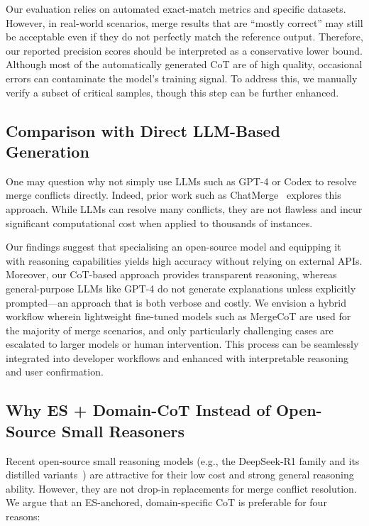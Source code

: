 \documentclass[sigconf,review,anonymous]{acmart}
\begin{document}
Our evaluation relies on automated exact-match metrics and specific datasets. However, in real-world scenarios, merge results that are “mostly correct” may still be acceptable even if they do not perfectly match the reference output. Therefore, our reported precision scores should be interpreted as a conservative lower bound.
Although most of the automatically generated CoT are of high quality, occasional errors can contaminate the model's training signal. To address this, we manually verify a subset of critical samples, though this step can be further enhanced.

\subsection{Comparison with Direct LLM-Based Generation}

One may question why not simply use LLMs such as GPT-4 or Codex to resolve merge conflicts directly. Indeed, prior work such as ChatMerge~\cite{17} explores this approach. While LLMs can resolve many conflicts, they are not flawless and incur significant computational cost when applied to thousands of instances.

Our findings suggest that specialising an open-source model and equipping it with reasoning capabilities yields high accuracy without relying on external APIs. Moreover, our CoT-based approach provides transparent reasoning, whereas general-purpose LLMs like GPT-4 do not generate explanations unless explicitly prompted—an approach that is both verbose and costly.
We envision a hybrid workflow wherein lightweight fine-tuned models such as MergeCoT are used for the majority of merge scenarios, and only particularly challenging cases are escalated to larger models or human intervention. This process can be seamlessly integrated into developer workflows and enhanced with interpretable reasoning and user confirmation.

\subsection{Why ES + Domain-CoT Instead of Open-Source Small Reasoners}

Recent open-source small reasoning models (e.g., the DeepSeek-R1 family and its distilled variants~\cite{deepseekr1}) are attractive for their low cost and strong general reasoning ability. However, they are not drop-in replacements for merge conflict resolution. We argue that an ES-anchored, domain-specific CoT is preferable for four reasons:
\end{document}
